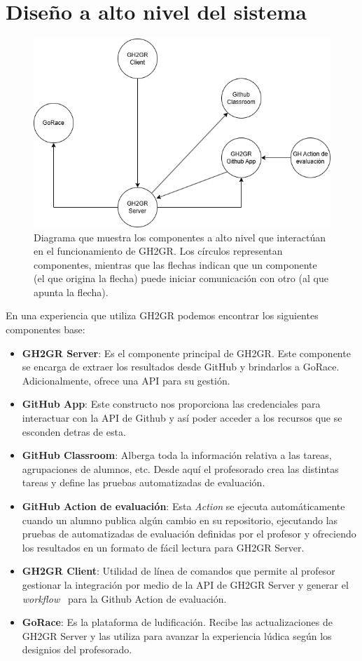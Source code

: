\section{Diseño a alto nivel del sistema}
\begin{figure}
    \centering
    \includegraphics[width=0.75\linewidth]{images/comunicacion-componentes.png}
    \caption{Diagrama que muestra los componentes a alto nivel que interactúan en el funcionamiento de GH2GR. Los círculos representan componentes, mientras que las flechas indican que un componente (el que origina la flecha) puede iniciar comunicación con otro (al que apunta la flecha).}
\end{figure}
En una experiencia que utiliza GH2GR podemos encontrar los siguientes componentes base:
\begin{itemize}
    \item \textbf{GH2GR Server}: Es el componente principal de GH2GR. Este componente se encarga de extraer los resultados desde GitHub y brindarlos a GoRace. Adicionalmente, ofrece una \acrshort{API} para su gestión.
    \item \textbf{GitHub App}: Este constructo nos proporciona las credenciales para interactuar con la \acrshort{API} de Github y así poder acceder a los recursos que se esconden detras de esta.
    \item \textbf{GitHub Classroom}: Alberga toda la información relativa a las tareas, agrupaciones de alumnos, etc. Desde aquí el profesorado crea las distintas tareas y define las pruebas automatizadas de evaluación.
    \item \textbf{GitHub Action de evaluación}: Esta \textit{Action} se ejecuta automáticamente cuando un alumno publica algún cambio en su repositorio, ejecutando las pruebas de automatizadas de evaluación definidas por el profesor y ofreciendo los resultados en un formato de fácil lectura para GH2GR Server.
    \item \textbf{GH2GR Client}: Utilidad de línea de comandos que permite al profesor gestionar la integración por medio de la \acrshort{API} de GH2GR Server y generar el \textit{workflow}~\cite{githubUnderstandingActions} para la Github Action de evaluación.
    \item \textbf{GoRace}: Es la plataforma de ludificación. Recibe las actualizaciones de GH2GR Server y las utiliza para avanzar la experiencia lúdica según los designios del profesorado.
\end{itemize}

